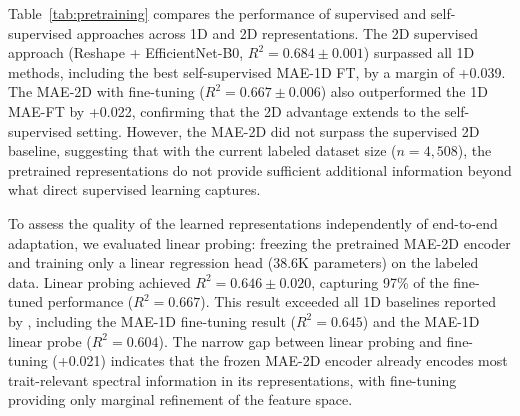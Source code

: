 Table~\ref{tab:pretraining} compares the performance of supervised and self-supervised approaches across 1D and 2D representations. %
The 2D supervised approach (Reshape + EfficientNet-B0, $R^2 = 0.684 \pm 0.001$) surpassed all 1D methods, including the best self-supervised MAE-1D FT, by a margin of +0.039. %
The MAE-2D with fine-tuning ($R^2 = 0.667 \pm 0.006$) also outperformed the 1D MAE-FT by +0.022, confirming that the 2D advantage extends to the self-supervised setting. However, the MAE-2D did not surpass the supervised 2D baseline, suggesting that with the current labeled dataset size ($n = 4{,}508$), the pretrained representations do not provide sufficient additional information beyond what direct supervised learning captures.

To assess the quality of the learned representations independently of end-to-end adaptation, we evaluated linear probing: freezing the pretrained MAE-2D encoder and training only a linear regression head (38.6K parameters) on the labeled data. Linear probing achieved $R^2 = 0.646 \pm 0.020$, capturing 97\% of the fine-tuned performance ($R^2 = 0.667$). This result exceeded all 1D baselines reported by \citet{cherif2025greenhyperspectra}, including the MAE-1D fine-tuning result ($R^2 = 0.645$) and the MAE-1D linear probe ($R^2 = 0.604$). The narrow gap between linear probing and fine-tuning (+0.021) indicates that the frozen MAE-2D encoder already encodes most trait-relevant spectral information in its representations, with fine-tuning providing only marginal refinement of the feature space.



\subsection{}
\label{sec:results_importance}


